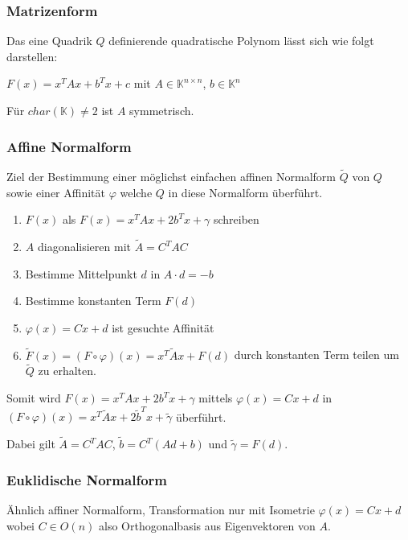 \subsubsection*{Matrizenform}

Das eine Quadrik $Q$ definierende quadratische Polynom lässt sich wie folgt darstellen:

$F(x) = x^TAx + b^Tx + c$ mit $A \in \mathbb{K}^{n\times n}$, $b \in \mathbb{K}^n$

Für $char(\mathbb{K})\neq 2$ ist $A$ symmetrisch.

\subsubsection*{Affine Normalform}

Ziel der Bestimmung einer möglichst einfachen affinen Normalform $\tilde Q$ von $Q$ sowie einer Affinität $\varphi$ welche $Q$ in diese Normalform überführt.

\begin{enumerate}[leftmargin=4mm]
	\item $F(x)$ als $F(x) = x^TAx + 2b^Tx + \gamma$ schreiben
	\item $A$ diagonalisieren mit $\tilde A = C^TAC$
	\item Bestimme Mittelpunkt $d$ in $A \cdot d=-b$
	\item Bestimme konstanten Term $F(d)$
	\item $\varphi(x)=Cx+d$ ist gesuchte Affinität
	\item $\tilde F(x) = (F \circ \varphi)(x) = x^T\tilde Ax+F(d)$ durch konstanten Term teilen um $\tilde Q$ zu erhalten.
\end{enumerate}

Somit wird $F(x)=x^TAx+2b^Tx+\gamma$ mittels $\varphi(x)=Cx+d$ in $(F \circ \varphi)(x)=x^T\tilde Ax+2\tilde b^Tx + \tilde\gamma$ überführt.

Dabei gilt $\tilde A = C^TAC$, $\tilde b = C^T(Ad+b)$ und $\tilde\gamma = F(d)$.

\subsubsection*{Euklidische Normalform}

Ähnlich affiner Normalform, Transformation nur mit Isometrie $\varphi(x)=Cx+d$ wobei $C \in O(n)$ also Orthogonalbasis aus Eigenvektoren von $A$.

